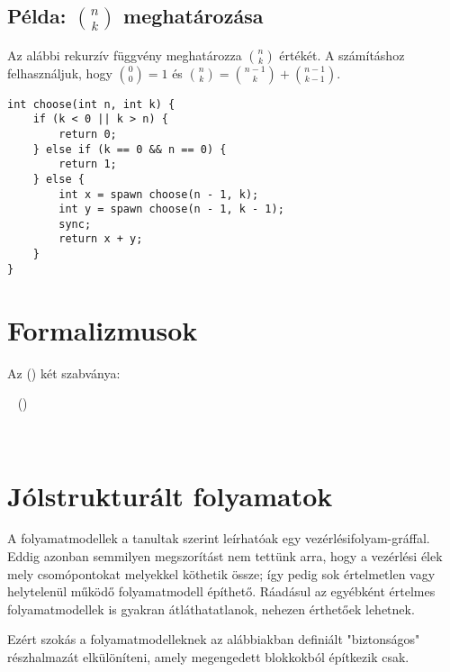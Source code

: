 \subsection{Példa: $n \choose k$ meghatározása}

Az alábbi rekurzív függvény meghatározza $n \choose k$ értékét. A számításhoz felhasználjuk, hogy ${0 \choose 0} = 1$ és ${n \choose k} = {n-1 \choose k} + {n-1 \choose k-1}$.


\begin{minipage}{\balhasab}
\begin{lstlisting}
int choose(int n, int k) {
	if (k < 0 || k > n) {
		return 0;
	} else if (k == 0 && n == 0) {
		return 1;
	} else {
		int x = spawn choose(n - 1, k);
		int y = spawn choose(n - 1, k - 1);
		sync;
		return x + y;
	}
}
\end{lstlisting}
\end{minipage}
\begin{minipage}{\jobbhasab}
\end{minipage}



\section{Formalizmusok}

Az  () két szabványa:

~\cite{UML}  ()

~\cite{omg2011bpmn}





\section{Jólstrukturált folyamatok}\label{sec:jolstrukturalt-folyamatok}

A folyamatmodellek a tanultak szerint leírhatóak egy vezérlésifolyam-gráffal. Eddig azonban semmilyen megszorítást nem tettünk arra, hogy a vezérlési élek mely csomópontokat melyekkel köthetik össze; így pedig sok értelmetlen vagy helytelenül működő folyamatmodell építhető. Ráadásul az egyébként értelmes folyamatmodellek is gyakran átláthatatlanok, nehezen érthetőek lehetnek. 

Ezért szokás a folyamatmodelleknek az alábbiakban definiált "biztonságos" részhalmazát elkülöníteni, amely megengedett blokkokból építkezik csak. 

